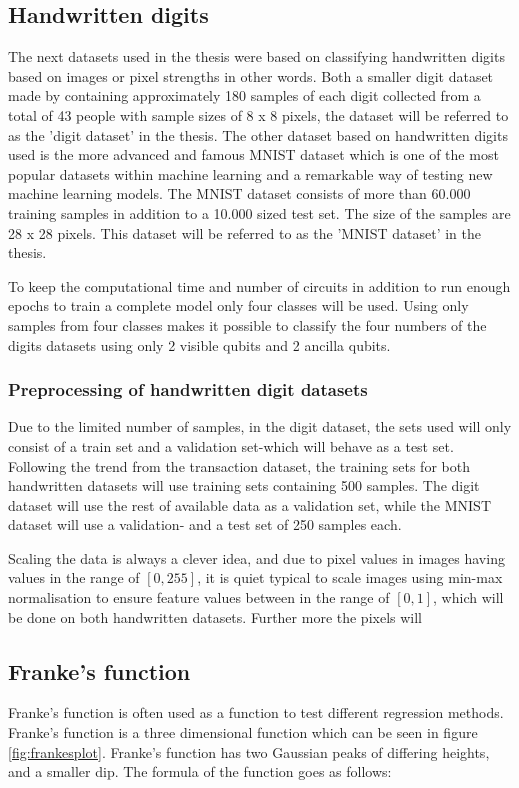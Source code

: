 \documentclass[../main.tex]{subfiles}
\begin{document}
\subsection{Handwritten digits}
The next datasets used in the thesis were based on classifying handwritten digits based on images or pixel strengths in other words. Both a smaller digit dataset made by \cite{UCI_repo2019} containing approximately 180 samples of each digit collected from a total of 43 people with sample sizes of 8 x 8 pixels, the dataset will be referred to as the 'digit dataset' in the thesis. The other dataset based on handwritten digits used is the more advanced and famous MNIST dataset\cite{deng2012mnist} which is one of the most popular datasets within machine learning and a remarkable way of testing new machine learning models. The MNIST dataset consists of more than 60.000 training samples in addition to a 10.000 sized test set. The size of the samples are 28 x 28 pixels. This dataset will be referred to as the 'MNIST dataset' in the thesis.

To keep the computational time and number of circuits in addition to run enough epochs to train a complete model only four classes will be used. Using only samples from four classes makes it possible to classify the four numbers of the digits datasets using only 2 visible qubits and 2 ancilla qubits.

\subsubsection{Preprocessing of handwritten digit datasets}
Due to the limited number of samples, in the digit dataset, the sets used will only consist of a train set and a validation set-which will behave as a test set. Following the trend from the transaction dataset, the training sets for both handwritten datasets will use training sets containing 500 samples. The digit dataset will use the rest of available data as a validation set, while the MNIST dataset will use a validation- and a test set of 250 samples each.

Scaling the data is always a clever idea, and due to pixel values in images having values in the range of $[0,255]$, it is quiet typical to scale images using min-max normalisation to ensure feature values between in the range of $[0,1]$, which will be done on both handwritten datasets. Further more the pixels will 

\subsection{Franke's function}
Franke's function is often used as a function to test different regression methods. Franke's function is a three dimensional function which can be seen in figure \autoref{fig:frankesplot}. Franke's function has two Gaussian peaks of differing heights, and a smaller dip. The formula of the function goes as follows:
\end{document}
